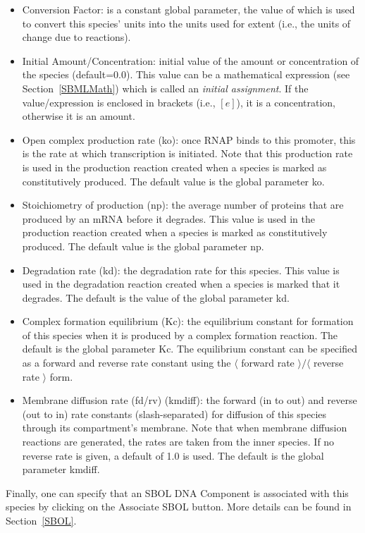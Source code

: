 \documentclass[titlepage,11pt]{article}
\begin{document}
\begin{itemize}
\item Conversion Factor: is a constant global parameter, the value of which is used to convert this species' units into the units used for extent (i.e., the units of change due to reactions).
\item Initial Amount/Concentration: initial value of the amount or concentration of the species (default=0.0).  This value can be a mathematical expression (see Section~\ref{SBMLMath}) which is called an \emph{initial assignment}.  If the value/expression is enclosed in brackets (i.e., $[e]$), it is a concentration, otherwise it is an amount.  
\item Open complex production rate (ko): once RNAP binds to this promoter, this is the rate at which transcription is initiated.  Note that this production rate is used in the production reaction created when a species is marked as constitutively produced.  The default value is the global parameter ko.
\item Stoichiometry of production (np): the average number of proteins that are produced by an mRNA before it degrades.  This value is used in the production reaction created when a species is marked as constitutively produced.  The default value is the global parameter np.
\item Degradation rate (kd): the degradation rate for this species.  This value is used in the degradation reaction created when a species is marked that it degrades.  The default is the value of the global parameter kd.  
\item Complex formation equilibrium (Kc): the equilibrium constant for formation of this species when it is produced by a complex formation reaction.  The default is the global parameter Kc.  The equilibrium constant can be specified as a forward and reverse rate constant using the $\langle$ forward rate $\rangle / \langle$ reverse rate $\rangle$ form.
\item Membrane diffusion rate (fd/rv) (kmdiff): the forward (in to out) and reverse (out to in) rate constants (slash-separated) for diffusion of this species through its compartment's membrane.  Note that when membrane diffusion reactions are generated, the rates are taken from the inner species.  If no reverse rate is given, a default of 1.0 is used.  The default is the global parameter kmdiff.
\end{itemize}
Finally, one can specify that an SBOL DNA Component is associated with this species by clicking on the Associate SBOL button.  More details can be found in Section~\ref{SBOL}.
\end{document}

